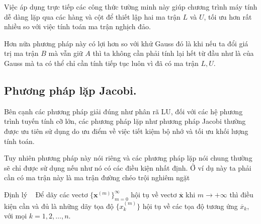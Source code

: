 
Việc áp dụng trực tiếp các công thức tường minh này giúp chương trình máy tính dễ dàng lặp qua các hàng và cột để thiết lập hai ma trận $L$ và $U$, tối ưu hơn rất nhiều so với việc tính toán ma trận nghịch đảo.

Hơn nữa phương pháp này có lợi hơn so với khử Gauss đó là khi nếu ta đổi giá trị ma trận $B$ mà vẫn giữ $A$ thì ta không cần phải tính lại hết từ đầu như là của Gauss mà ta có thể chỉ cần tính tiếp tục luôn vì đã có ma trận $L, U$.


\subsection{Phương pháp lặp Jacobi.}

Bên cạnh các phương pháp giải đúng như phân rã LU, đối với các hệ phương trình tuyến tính cỡ lớn, các phương pháp lặp như phương pháp Jacobi thường được ưu tiên sử dụng do ưu điểm về việc tiết kiệm bộ nhớ và tối ưu khối lượng tính toán.

Tuy nhiên phương pháp này nói riêng và các phương pháp lặp nói chung thường sẽ chỉ được sử dụng nếu như nó có các điều kiện nhất định. Ở ví dụ này ta phải cần có ma trận này là ma trận đường chéo trội nghiêm ngặt
\begin{bt}{Định lý ~\cite{dau2026hephuongtrinh}}
    Để dãy các vectơ \(\{\mathbf{x}^{(m)}\}_{m=0}^\infty\) hội tụ về vectơ \({\overline{\mathbf{x}}}\) khi \(m \to +\infty\) thì điều kiện cần và đủ là những dãy tọa độ \(\{x_k^{(m)}\}\) hội tụ về các tọa độ tương ứng \(\overline{x}_{k}\), với mọi \(k = 1, 2, \dots, n\).
\end{bt}

